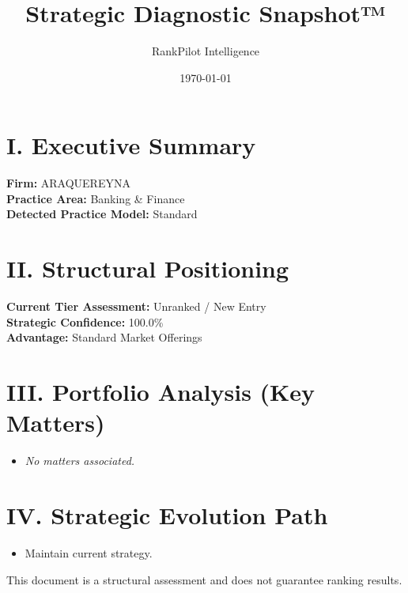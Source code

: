 \documentclass[11pt]{article}
\title{\textbf{Strategic Diagnostic Snapshot™}}
\author{RankPilot Intelligence}
\date{\today}
\begin{document}
\maketitle

\section*{I. Executive Summary}
\textbf{Firm:} ARAQUEREYNA \\
\textbf{Practice Area:} Banking & Finance \\
\textbf{Detected Practice Model:} Standard

\section*{II. Structural Positioning}
\textbf{Current Tier Assessment:} Unranked / New Entry \\
\textbf{Strategic Confidence:} 100.0\% \\
\textbf{Advantage:} Standard Market Offerings

\section*{III. Portfolio Analysis (Key Matters)}
\begin{itemize}
\item \textit{No matters associated.}
\end{itemize}

\section*{IV. Strategic Evolution Path}
\begin{itemize}
\item Maintain current strategy.
\end{itemize}

\vfill
\centering
\small{This document is a structural assessment and does not guarantee ranking results.}
\end{document}
